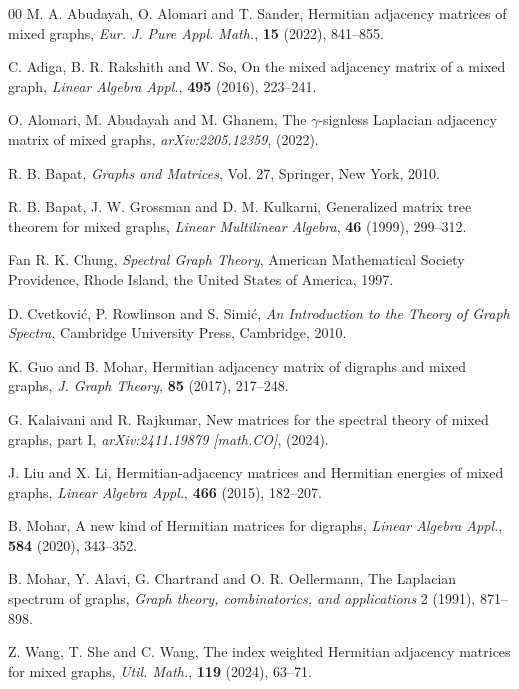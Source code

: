 \documentclass[12pt]{article}
\numberwithin{equation}{section}
\begin{document}
		\begin{thebibliography}{00}
		M. A. Abudayah, O. Alomari and T. Sander, Hermitian adjacency matrices of mixed graphs, \textit{Eur. J. Pure Appl. Math.}, \textbf{15} (2022), 841--855.
		
		C. Adiga, B. R. Rakshith and W. So, On the mixed adjacency matrix of a mixed graph, \textit{Linear Algebra Appl.}, \textbf{495} (2016), 223--241.
		
		O. Alomari, M. Abudayah and M. Ghanem, The $\gamma $-signless Laplacian adjacency matrix of mixed graphs, \textit{arXiv:2205.12359}, (2022).
		
		R. B. Bapat, \textit{Graphs and Matrices}, Vol. 27, Springer, New York, 2010.
		
		R. B. Bapat, J. W. Grossman and  D. M. Kulkarni, Generalized matrix tree theorem for mixed graphs, \textit{Linear Multilinear Algebra}, \textbf{46} (1999), 299--312.
		
		Fan R. K. Chung, \textit{Spectral Graph Theory}, American Mathematical Society Providence, Rhode Island, the United States of America, 1997.
		
		D. Cvetkovi\'{c}, P. Rowlinson and S. Simi\'{c}, \textit{An Introduction to the Theory of Graph Spectra}, Cambridge University Press, Cambridge, 2010.
		
		K. Guo and B. Mohar, Hermitian adjacency matrix of digraphs and mixed graphs, \textit{J. Graph Theory}, \textbf{85} (2017), 217--248.
		
	G. Kalaivani and R. Rajkumar, New matrices for the spectral theory of mixed graphs, part I,  \textit{arXiv:2411.19879 [math.CO]}, (2024).
		
		J. Liu and X. Li, Hermitian-adjacency matrices and Hermitian energies of mixed graphs, \textit{Linear Algebra Appl.}, \textbf{466} (2015), 182--207.
		
		B. Mohar, A new kind of Hermitian matrices for digraphs, \textit{Linear Algebra Appl.}, \textbf{584} (2020), 343--352.
		
		B. Mohar, Y. Alavi, G. Chartrand and O. R. Oellermann, The Laplacian spectrum of graphs, \textit{Graph theory, combinatorics, and applications} 2 (1991), 871--898.
		
		 Z. Wang, T. She and C. Wang, The index weighted Hermitian adjacency matrices for mixed graphs, \textit{Util. Math.}, \textbf{119} (2024), 63--71.
		

\end{thebibliography}
\end{document}
